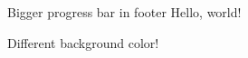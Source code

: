 \documentclass{beamer}
\begin{document}
  \begin{frame}{Bigger progress bar in footer}
    Hello, world!
  \end{frame}

  \begin{frame}[standout]
    Different background color!
  \end{frame}
\end{document}
